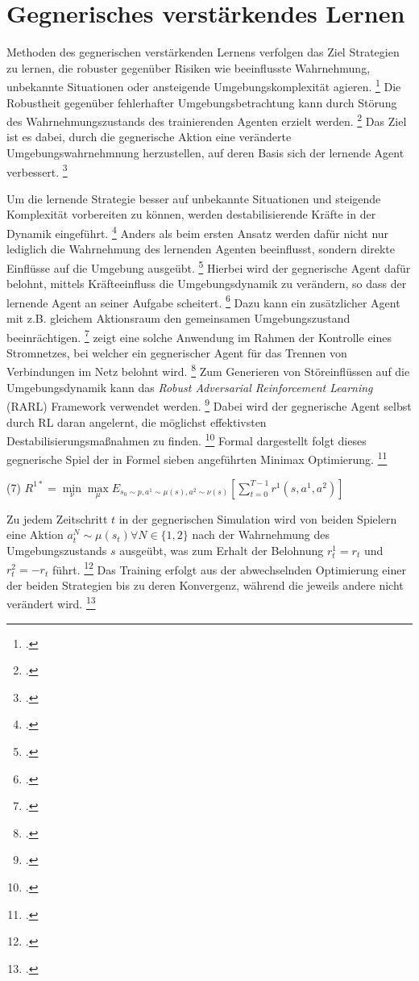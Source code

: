 \section{Gegnerisches verstärkendes Lernen}
Methoden des gegnerischen verstärkenden Lernens verfolgen das Ziel Strategien zu lernen, die robuster gegenüber Risiken wie beeinflusste Wahrnehmung, unbekannte Situationen oder ansteigende Umgebungskomplexität agieren. \footcite[Vgl.][S. 2]{Schott.2022}
Die Robustheit gegenüber fehlerhafter Umgebungsbetrachtung kann durch Störung des Wahrnehmungszustands des trainierenden Agenten erzielt werden. \footcite[Vgl.][S. 2]{Schott.2022}
Das Ziel ist es dabei, durch die gegnerische Aktion eine veränderte Umgebungswahrnehmnung herzustellen, auf deren Basis sich der lernende Agent verbessert. \footcite[Vgl.][S. 3]{Schott.2022}

Um die lernende Strategie besser auf unbekannte Situationen und steigende Komplexität vorbereiten zu können, werden destabilisierende Kräfte in der Dynamik eingeführt. \footcite[Vgl.][S. 1]{Pinto.2017}
Anders als beim ersten Ansatz werden dafür nicht nur lediglich die Wahrnehmung des lernenden Agenten beeinflusst, sondern direkte Einflüsse auf die Umgebung ausgeübt. \footcite[Vgl.][S. 2]{Schott.2022}
Hierbei wird der gegnerische Agent dafür belohnt, mittels Kräfteeinfluss die Umgebungsdynamik zu verändern, so dass der lernende Agent an seiner Aufgabe scheitert. \footcite[Vgl.][S. 2]{Pinto.2017}
Dazu kann ein zusätzlicher Agent mit z.B. gleichem Aktionsraum den gemeinsamen Umgebungszustand beeinrächtigen. \footcite[Vgl.][S. 2]{Pinto.2017}
\cite[]{Pan.2021} zeigt eine solche Anwendung im Rahmen der Kontrolle eines Stromnetzes, bei welcher ein gegnerischer Agent für das Trennen von Verbindungen im Netz belohnt wird. \footcite[Vgl.][S. 2]{Pan.2021}
Zum Generieren von Störeinflüssen auf die Umgebungsdynamik kann das \textit{Robust Adversarial Reinforcement Learning} (RARL) Framework verwendet werden. \footcite[Vgl.][S. 2]{Schott.2022}
Dabei wird der gegnerische Agent selbst durch RL daran angelernt, die möglichst effektivsten Destabilisierungsmaßnahmen zu finden. \footcite[Vgl.][S. 1]{Pinto.2017}
Formal dargestellt folgt dieses gegnerische Spiel der in Formel sieben angeführten Minimax Optimierung. \footcite[Vgl.][S. 3]{Pinto.2017}
\begin{description}
    \item \begin{center} (7) $R^{1*} = \underset{\nu}{\min}\underset{\mu}{\max} E_{s_{0}\sim p,a^{1}\sim\mu(s),a^{2}\sim\nu(s)} [\sum_{t=0}^{T-1} r^{1} (s,a^{1},a^{2})]$ \end{center} 
\end{description}
Zu jedem Zeitschritt $t$ in der gegnerischen Simulation wird von beiden Spielern eine Aktion $a_{t}^{N} \sim \mu(s_{t}) \forall N \in \{1,2\}$ nach der Wahrnehmung des Umgebungszustands $s$ ausgeübt, was zum Erhalt der Belohnung $r_{t}^{1} = r_{t}$ und $r_{t}^{2} = -r_{t}$ führt. \footcite[Vgl.][S. 3f.]{Pinto.2017}
Das Training erfolgt aus der abwechselnden Optimierung einer der beiden Strategien bis zu deren Konvergenz, während die jeweils andere nicht verändert wird. \footcite[Vgl.][S. 4]{Pinto.2017}

